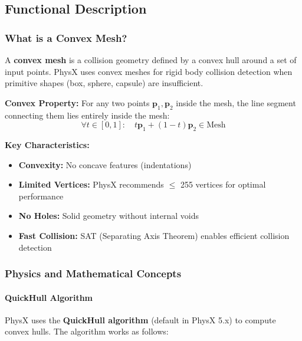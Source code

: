 
\subsection{Functional Description}

\subsubsection{What is a Convex Mesh?}

A \textbf{convex mesh} is a collision geometry defined by a convex hull around a set of input points. PhysX uses convex meshes for rigid body collision detection when primitive shapes (box, sphere, capsule) are insufficient.

\textbf{Convex Property:} For any two points $\mathbf{p}_1, \mathbf{p}_2$ inside the mesh, the line segment connecting them lies entirely inside the mesh:
\begin{equation}
\forall t \in [0,1]: \quad t\mathbf{p}_1 + (1-t)\mathbf{p}_2 \in \text{Mesh}
\end{equation}

\textbf{Key Characteristics:}
\begin{itemize}
    \item \textbf{Convexity:} No concave features (indentations)
    \item \textbf{Limited Vertices:} PhysX recommends $\leq$ 255 vertices for optimal performance
    \item \textbf{No Holes:} Solid geometry without internal voids
    \item \textbf{Fast Collision:} SAT (Separating Axis Theorem) enables efficient collision detection
\end{itemize}

\subsubsection{Physics and Mathematical Concepts}

\paragraph{QuickHull Algorithm}

PhysX uses the \textbf{QuickHull algorithm} (default in PhysX 5.x) to compute convex hulls. The algorithm works as follows:

